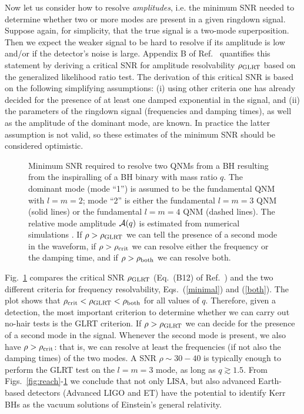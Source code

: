 \documentclass[]{iopart}
\begin{document}
Now let us consider how to resolve {\it amplitudes}, i.e. the minimum SNR
needed to determine whether two or more modes are present in a given ringdown
signal.  Suppose again, for simplicity, that the true signal is a two-mode
superposition. Then we expect the weaker signal to be hard to resolve if its
amplitude is low and/or if the detector's noise is large. Appendix B of
Ref.~\cite{Berti:2007zu} quantifies this statement by deriving a critical SNR
for amplitude resolvability $\rho_{\rm GLRT}$ based on the generalized
likelihood ratio test. The derivation of this critical SNR is based on the
following simplifying assumptions: (i) using other criteria one has already
decided for the presence of at least one damped exponential in the signal, and
(ii) the parameters of the ringdown signal (frequencies and damping times), as
well as the amplitude of the dominant mode, are known. In practice the latter
assumption is not valid, so these estimates of the minimum SNR should be
considered optimistic.
%
\begin{figure}[ht]
\begin{center}
\end{center}
\caption{Minimum SNR required to resolve two QNMs from a BH resulting from the
  inspiralling of a BH binary with mass ratio $q$.  The dominant mode (mode
  ``1'') is assumed to be the fundamental QNM with $l=m=2$; mode ``2'' is
  either the fundamental $l=m=3$ QNM (solid lines) or the fundamental $l=m=4$
  QNM (dashed lines). The relative mode amplitude ${\cal A}(q)$ is estimated
  from numerical simulations \cite{Berti:2007fi}. If $\rho>\rho_{\rm GLRT}$ we
  can tell the presence of a second mode in the waveform, if $\rho>\rho_{\rm
    crit}$ we can resolve either the frequency or the damping time, and if
  $\rho>\rho_{\rm both}$ we can resolve both.}
\label{fig:minimumSNR}
\end{figure}
%
Fig.~\ref{fig:minimumSNR} compares the critical SNR $\rho_{\rm GLRT}$
(Eq.~(B12) of Ref.~\cite{Berti:2007zu}) and the two different criteria for
frequency resolvability, Eqs.~(\ref{minimal}) and (\ref{both}). The plot shows
that $\rho_{\rm crit}<\rho_{\rm GLRT}<\rho_{\rm both}$ for all values of
$q$. Therefore, given a detection, the most important criterion to determine
whether we can carry out no-hair tests is the GLRT criterion. If
$\rho>\rho_{\rm GLRT}$ we can decide for the presence of a second mode in the
signal. Whenever the second mode is present, we also have $\rho>\rho_{\rm
  crit}$: that is, we can resolve at least the frequencies (if not also the
damping times) of the two modes. A SNR $\rho \sim 30-40$ is typically enough
to perform the GLRT test on the $l=m=3$ mode, as long as $q\gtrsim 1.5$. From
Figs.~\ref{fig:reach}-\ref{fig:minimumSNR} we conclude that not only LISA,
but also advanced Earth-based detectors (Advanced LIGO and ET) have the
potential to identify Kerr BHs as the vacuum solutions of Einstein's general
relativity.
\end{document}
